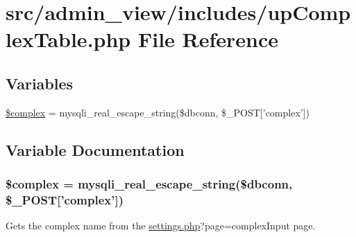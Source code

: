 \hypertarget{upComplexTable_8php}{\section{src/admin\-\_\-view/includes/up\-Complex\-Table.php \-File \-Reference}
\label{upComplexTable_8php}
}
\subsection*{\-Variables}
\begin{DoxyCompactItemize}
\item 
\hyperlink{upComplexTable_8php_a25ec02534214977602829622b78b5d78}{\$complex} = mysqli\-\_\-real\-\_\-escape\-\_\-string(\$dbconn, \$\-\_\-\-P\-O\-S\-T\mbox{[}'complex'\mbox{]})
\end{DoxyCompactItemize}


\subsection{\-Variable \-Documentation}
\hypertarget{upComplexTable_8php_a25ec02534214977602829622b78b5d78}{
\subsubsection[{\$complex}]{\setlength{\rightskip}{0pt plus 5cm}\$complex = mysqli\-\_\-real\-\_\-escape\-\_\-string(\$dbconn, \$\-\_\-\-P\-O\-S\-T\mbox{[}'complex'\mbox{]})}}\label{upComplexTable_8php_a25ec02534214977602829622b78b5d78}
\-Gets the complex name from the \hyperlink{settings_8php}{settings.\-php}?page=complex\-Input page. 